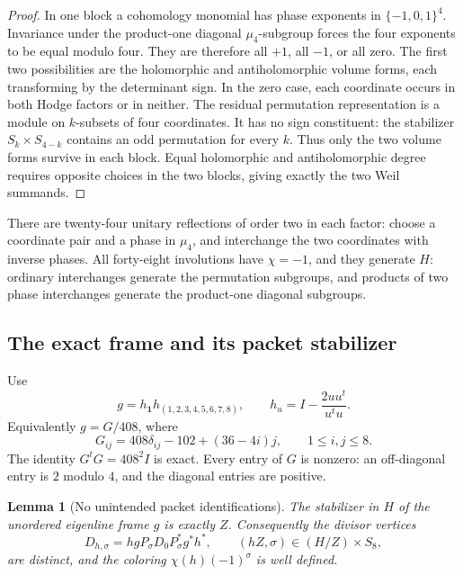 \documentclass[11pt]{article}
\newtheorem{lemma}[theorem]{Lemma}
\theoremstyle{definition}
\theoremstyle{remark}
\begin{document}
\begin{proof}
In one block a cohomology monomial has phase exponents in
\(\{-1,0,1\}^4\).  Invariance under the product-one diagonal
\(\mu_4\)-subgroup forces the four exponents to be equal modulo
four.  They are therefore all \(+1\), all \(-1\), or all zero.
The first two possibilities are the holomorphic and antiholomorphic
volume forms, each transforming by the determinant sign.
In the zero case, each coordinate occurs in both Hodge factors or
in neither.  The residual permutation representation is a module on
\(k\)-subsets of four coordinates.  It has no sign constituent:
the stabilizer \(S_k\times S_{4-k}\) contains an odd permutation
for every \(k\).  Thus only the two volume forms survive in each
block.  Equal holomorphic and antiholomorphic degree requires
opposite choices in the two blocks, giving exactly the two Weil
summands.
\end{proof}

There are twenty-four unitary reflections of order two in each factor:
choose a coordinate pair and a phase in \(\mu_4\), and interchange
the two coordinates with inverse phases.  All forty-eight
involutions have \(\chi=-1\), and they generate \(H\): ordinary
interchanges generate the permutation subgroups, and products of
two phase interchanges generate the product-one diagonal subgroups.

\subsection{The exact frame and its packet stabilizer}

Use
\[
 g=h_{\mathbf1}h_{(1,2,3,4,5,6,7,8)},\qquad
 h_u=I-\frac{2uu^t}{u^tu}.
\]
Equivalently \(g=G/408\), where
\begin{equation}
 G_{ij}=408\delta_{ij}-102+(36-4i)j,
 \qquad 1\le i,j\le8.
 \label{eq:gaussian-exact-frame}
\end{equation}
The identity \(G^tG=408^2I\) is exact.  Every entry of \(G\)
is nonzero: an off-diagonal entry is \(2\) modulo \(4\), and the
diagonal entries are positive.

\begin{lemma}[No unintended packet identifications]\label{lem:gaussian-trace-frame}
The stabilizer in \(H\) of the unordered eigenline frame \(g\)
is exactly \(Z\).  Consequently the divisor vertices
\[
 D_{h,\sigma}=hgP_\sigma D_0P_\sigma^*g^*h^*,
 \qquad (hZ,\sigma)\in(H/Z)\times S_8,
\]
are distinct, and the coloring \(\chi(h)(-1)^\sigma\) is
well defined.
\end{lemma}
\end{document}
